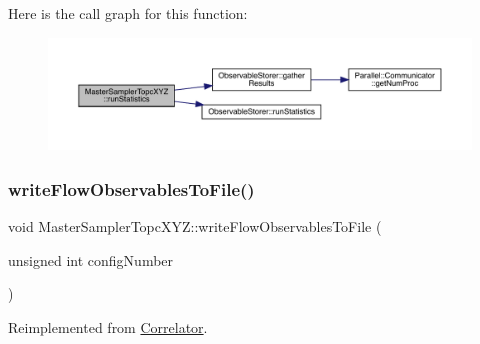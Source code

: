 Here is the call graph for this function\+:\nopagebreak
\begin{figure}[H]
\begin{center}
\leavevmode
\includegraphics[width=350pt]{class_master_sampler_topc_x_y_z_af748653ded9908f78383185475b9ddeb_cgraph}
\end{center}
\end{figure}
\mbox{\label{class_master_sampler_topc_x_y_z_a4fba4290e4406e18ef3f2904c6ae364f}} 
\subsubsection{\texorpdfstring{writeFlowObservablesToFile()}{writeFlowObservablesToFile()}}
{\footnotesize\ttfamily void Master\+Sampler\+Topc\+X\+Y\+Z\+::write\+Flow\+Observables\+To\+File (\begin{DoxyParamCaption}\item[{unsigned int}]{config\+Number }\end{DoxyParamCaption})\hspace{0.3cm}{\ttfamily [virtual]}}



Reimplemented from \mbox{\hyperlink{class_correlator_a168512b2ce182d9478db47f100125fa6}{Correlator}}.

